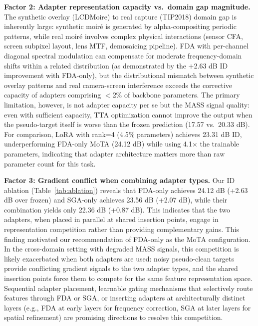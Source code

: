 \documentclass[10pt,twocolumn,letterpaper]{article}
\begin{document}
\textbf{Factor 2: Adapter representation capacity vs.\ domain gap magnitude.} The synthetic overlay (LCDMoire) to real capture (TIP2018) domain gap is inherently large: synthetic moir\'{e} is generated by alpha-compositing periodic patterns, while real moir\'{e} involves complex physical interactions (sensor CFA, screen subpixel layout, lens MTF, demosaicing pipeline). FDA with per-channel diagonal spectral modulation can compensate for moderate frequency-domain shifts within a related distribution (as demonstrated by the $+$2.63 dB ID improvement with FDA-only), but the distributional mismatch between synthetic overlay patterns and real camera-screen interference exceeds the corrective capacity of adapters comprising $<$2\% of backbone parameters. The primary limitation, however, is not adapter capacity per se but the MASS signal quality: even with sufficient capacity, TTA optimization cannot improve the output when the pseudo-target itself is worse than the frozen prediction (17.57 vs.\ 20.33 dB). For comparison, LoRA with rank=4 (4.5\% parameters) achieves 23.31 dB ID, underperforming FDA-only MoTA (24.12 dB) while using 4.1$\times$ the trainable parameters, indicating that adapter architecture matters more than raw parameter count for this task.

\textbf{Factor 3: Gradient conflict when combining adapter types.} Our ID ablation (Table~\ref{tab:ablation}) reveals that FDA-only achieves 24.12 dB (+2.63 dB over frozen) and SGA-only achieves 23.56 dB (+2.07 dB), while their combination yields only 22.36 dB (+0.87 dB). This indicates that the two adapters, when placed in parallel at shared insertion points, engage in representation competition rather than providing complementary gains. This finding motivated our recommendation of FDA-only as the MoTA configuration. In the cross-domain setting with degraded MASS signals, this competition is likely exacerbated when both adapters are used: noisy pseudo-clean targets provide conflicting gradient signals to the two adapter types, and the shared insertion points force them to compete for the same feature representation space. Sequential adapter placement, learnable gating mechanisms that selectively route features through FDA or SGA, or inserting adapters at architecturally distinct layers (e.g., FDA at early layers for frequency correction, SGA at later layers for spatial refinement) are promising directions to resolve this competition.
\end{document}
